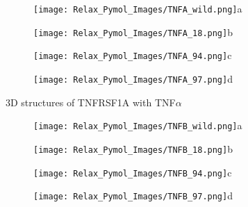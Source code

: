 	\begin{figure}[!ht]
		\centering
		\begin{subfigure}{0.45\textwidth}
			\texttt{[image: Relax\_Pymol\_Images/TNFA\_wild.png]}{a}
			\label{fig:RES_TNFA_wild}
		\end{subfigure}
		\begin{subfigure}{0.45\textwidth}
			\texttt{[image: Relax\_Pymol\_Images/TNFA\_18.png]}{b}
			\label{fig:RES_TNFA_18}
		\end{subfigure}
		\begin{subfigure}{0.45\textwidth}
			\texttt{[image: Relax\_Pymol\_Images/TNFA\_94.png]}{c}
			\label{fig:RES_TNFA_94}
		\end{subfigure}
		\begin{subfigure}{0.45\textwidth}
			\texttt{[image: Relax\_Pymol\_Images/TNFA\_97.png]}{d}
			\label{fig:RES_TNFA_97}
			\end{subfigure}
		\caption[TNFRSF1A homo trimer with TNF$\alpha$ homo trimers wild type and mutated relaxed models]{3D structures of TNFRSF1A with TNF$\alpha$}
		\end{figure}
		\newpage
		
		\begin{figure}[!ht]
		\centering
		\begin{subfigure}{0.45\textwidth}
			\texttt{[image: Relax\_Pymol\_Images/TNFB\_wild.png]}{a}
			\label{fig:RES_TNFB_wild}
		\end{subfigure}
		\begin{subfigure}{0.45\textwidth}
			\texttt{[image: Relax\_Pymol\_Images/TNFB\_18.png]}{b}
			\label{fig:RES_TNFB_18}
		\end{subfigure}
		\begin{subfigure}{0.45\textwidth}
			\texttt{[image: Relax\_Pymol\_Images/TNFB\_94.png]}{c}
			\label{fig:RES_TNFB_94}
		\end{subfigure}
		\begin{subfigure}{0.45\textwidth}
			\texttt{[image: Relax\_Pymol\_Images/TNFB\_97.png]}{d}
			\label{fig:RES_TNFB_97}
		\end{subfigure}
	\caption[TNFRSF1A homo trimer with TNF$\beta$ homo trimers wild type and mutated relaxed models]{}
	\end{figure}
	
